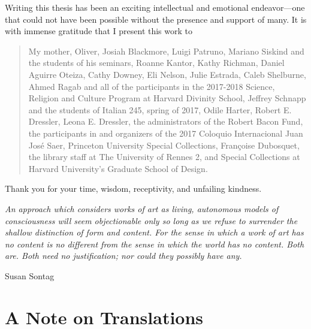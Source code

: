 \documentclass[11pt]{report}
\begin{document}
\begin{singlespacing}

\noindent Writing this thesis has been an exciting intellectual and emotional endeavor---one that could not have been possible without the presence and support of many. It is with immense gratitude that I present this work to

\begin{quotation}

\noindent My mother, Oliver, Josiah Blackmore, Luigi Patruno, Mariano Siskind and the students of his seminars, Roanne Kantor, Kathy Richman, Daniel Aguirre Oteiza, Cathy Downey, Eli Nelson, Julie Estrada, Caleb Shelburne, Ahmed Ragab and all of the participants in the 2017-2018 Science, Religion and Culture Program at Harvard Divinity School, Jeffrey Schnapp and the students of Italian 245, spring of 2017, Odile Harter, Robert E. Dressler, Leona E. Dressler, the administrators of the Robert Bacon Fund, the participants in and organizers of the 2017 Coloquio Internacional Juan José Saer, Princeton University Special Collections, Françoise Dubosquet, the library staff at The University of Rennes 2, and Special Collections at Harvard University's Graduate School of Design.

\end{quotation}
Thank you for your time, wisdom, receptivity, and unfailing kindness.

\end{singlespacing}

\newpage

\thispagestyle{plain}

\epigraph{\vspace{450pt} \singlespacing \raggedleft \textit{An approach which considers works of art as living, autonomous models of consciousness will seem objectionable only so long as we refuse to surrender the shallow distinction of form and content. For the sense in which a work of art has no content is no different from the sense in which the world has no content. Both are. Both need no justification; nor could they possibly have any.}}{\vspace{15pt} Susan Sontag}

\tableofcontents

\newpage


\chapter*{A Note on Translations}
\end{document}
